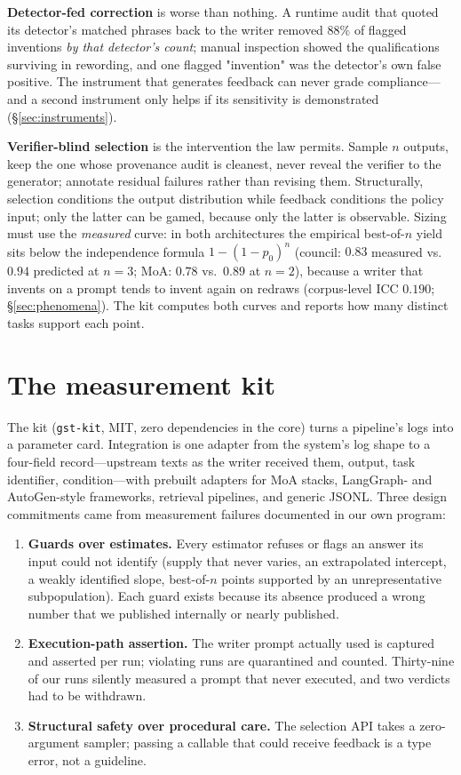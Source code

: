 \documentclass[11pt]{article}
\begin{document}
\textbf{Detector-fed correction} is worse than nothing. A runtime audit
that quoted its detector's matched phrases back to the writer removed
$88\%$ of flagged inventions \emph{by that detector's count}; manual
inspection showed the qualifications surviving in rewording, and one
flagged "invention" was the detector's own false positive. The instrument
that generates feedback can never grade compliance---and a second
instrument only helps if its sensitivity is demonstrated
(\S\ref{sec:instruments}).

\textbf{Verifier-blind selection} is the intervention the law permits.
Sample $n$ outputs, keep the one whose provenance audit is cleanest, never
reveal the verifier to the generator; annotate residual failures rather
than revising them. Structurally, selection conditions the output
distribution while feedback conditions the policy input; only the latter
can be gamed, because only the latter is observable. Sizing must use the
\emph{measured} curve: in both architectures the empirical best-of-$n$
yield sits below the independence formula $1-(1-p_0)^n$ (council:
$0.83$ measured vs.\ $0.94$ predicted at $n{=}3$; MoA: $0.78$ vs.\ $0.89$
at $n{=}2$), because a writer that invents on a prompt tends to invent
again on redraws (corpus-level ICC $0.190$; \S\ref{sec:phenomena}). The
kit computes both curves and reports how many
distinct tasks support each point.

\section{The measurement kit}
\label{sec:kit}

The kit (\texttt{gst-kit}, MIT, zero dependencies in the core) turns a
pipeline's logs into a parameter card. Integration is one adapter from the
system's log shape to a four-field record---upstream texts as the writer
received them, output, task identifier, condition---with prebuilt adapters
for MoA stacks, LangGraph- and AutoGen-style frameworks, retrieval
pipelines, and generic JSONL. Three design commitments came from
measurement failures documented in our own program:

\begin{enumerate}
\item \textbf{Guards over estimates.} Every estimator refuses or flags an
answer its input could not identify (supply that never varies, an
extrapolated intercept, a weakly identified slope, best-of-$n$ points
supported by an unrepresentative subpopulation). Each guard exists because
its absence produced a wrong number that we published internally or nearly
published.
\item \textbf{Execution-path assertion.} The writer prompt actually used is
captured and asserted per run; violating runs are quarantined and counted.
Thirty-nine of our runs silently measured a prompt that never executed, and
two verdicts had to be withdrawn.
\item \textbf{Structural safety over procedural care.} The selection API
takes a zero-argument sampler; passing a callable that could receive
feedback is a type error, not a guideline.
\end{enumerate}
\end{document}
